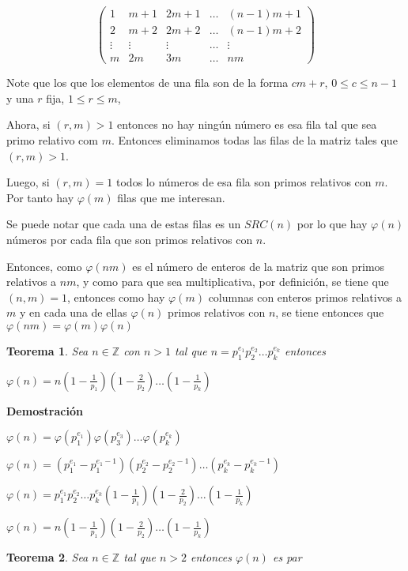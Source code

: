 \documentclass[a4paper,12pt]{report}
\newtheorem*{teo}{Teorema}
\begin{document}
\begin{equation}
\begin{pmatrix}
1 & m+1 & 2m+1& \dots & (n-1)m+1\\
2 & m+2 & 2m+2& \dots & (n-1)m+2\\
\vdots & \vdots & \vdots& \dots & \vdots\\
m & 2m & 3m& \dots & nm
\end{pmatrix}
\end{equation}

Note que los que los elementos de una fila son de la forma $cm + r$,  $0 \leq c \leq n-1$ y una $r$ fija, $1\leq r \leq m$,

Ahora, si $(r,m)>1$ entonces no hay ningún número es esa fila tal que sea primo relativo com $m$. Entonces eliminamos todas las filas de la matriz tales que $(r,m)>1$.

Luego, si $(r,m)=1$ todos lo números de esa fila son primos relativos con $m$. Por tanto hay $\varphi(m)$ filas que me interesan.

Se puede notar que cada una de estas filas es un $SRC(n)$ por lo que hay $\varphi(n)$ números por cada fila que son primos relativos con $n$.

Entonces, como $\varphi(nm)$ es el número de enteros de la matriz que son primos relativos a $nm$, y como para que sea multiplicativa, por definición, se tiene que $(n,m)=1$, entonces como hay $\varphi(m)$ columnas con enteros primos relativos a $m$ y en cada una de ellas $\varphi(n)$ primos relativos con $n$, se tiene entonces que $\varphi(nm)=\varphi(m)\varphi(n)$

\begin{teo}
 Sea $n\in\mathbb{Z}$ con $n>1$ tal que $n=p_1^{e_1}p_2^{e_2}\dots p_k^{e_k}$ entonces 
 
 $\varphi(n)=n(1-\frac{1}{p_1})(1-\frac{2}{p_2})\dots(1-\frac{1}{p_k})$
\end{teo}

\textbf{Demostración}

$\varphi(n)=\varphi(p_1^{e_1})\varphi(p_3^{e_3})\dots\varphi(p_k^{e_k})$

$\varphi(n)=(p_1^{e_1}-p_1^{e_1-1})(p_2^{e_2}-p_2^{e_2-1})\dots(p_k^{e_k}-p_k^{e_k-1})$

$\varphi(n)=p_1^{e_1}p_2^{e_2}\dots p_k^{e_k}(1-\frac{1}{p_1})(1-\frac{2}{p_2})\dots(1-\frac{1}{p_k})$

$\varphi(n)=n(1-\frac{1}{p_1})(1-\frac{2}{p_2})\dots(1-\frac{1}{p_k})$

\begin{teo}
 Sea $n\in\mathbb{Z}$ tal que $n>2$ entonces $\varphi(n)$ es par
\end{teo}
\end{document}
